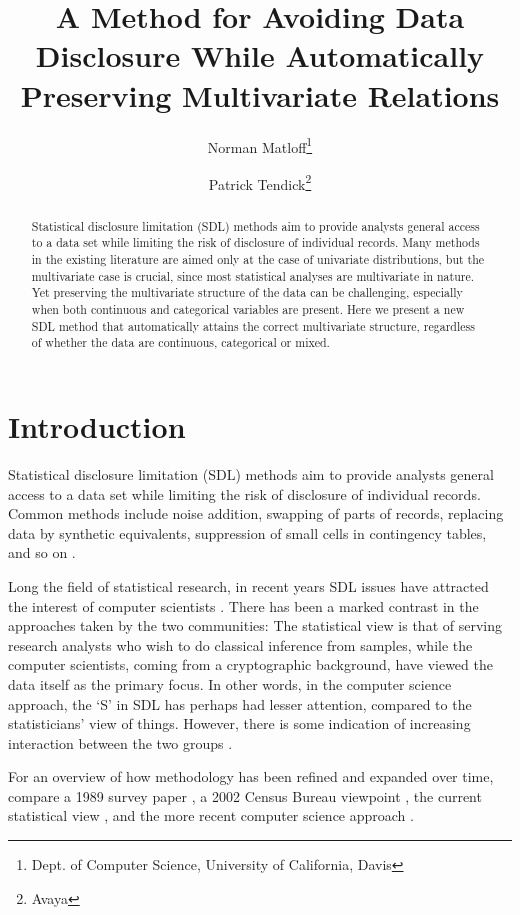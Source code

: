 \documentclass[11pt]{article}
\title{A Method for Avoiding Data Disclosure While
Automatically Preserving Multivariate Relations}
\author{
Norman Matloff\thanks{Dept. of Computer Science, University of
California, Davis}
\and
Patrick Tendick\thanks{Avaya}
}
\begin{document}
\maketitle

\begin{abstract}

\noindent 
Statistical disclosure limitation (SDL) methods aim to provide analysts
general access to a data set while limiting the risk of disclosure of
individual records.  Many methods in the existing literature are 
aimed only at the case of univariate distributions, but the 
multivariate case is crucial, since most statistical analyses are 
multivariate in nature.  Yet preserving the multivariate structure of 
the data can be challenging, especially when both continuous and
categorical variables are present.  Here we present a new SDL method 
that automatically attains the correct multivariate structure,
regardless of whether the data are continuous, categorical or mixed.

\end{abstract}

\section{Introduction}

Statistical disclosure limitation (SDL) methods aim to provide analysts
general access to a data set while limiting the risk of disclosure of
individual records.  Common methods include noise addition, swapping of
parts of records, replacing data by synthetic equivalents, suppression
of small cells in contingency tables, and so on \cite{duncan}. 


Long the field of statistical research, in recent years SDL issues have
attracted the interest of computer scientists \cite{dwork}.  There has
been a marked contrast in the approaches taken by the two communities:
The statistical view is that of serving research analysts who wish to do
classical inference from samples, while the computer scientists, coming
from a cryptographic background, have viewed the data itself as the
primary focus.  In other words, in the computer science approach, the
`S' in SDL has perhaps had lesser attention, compared to the
statisticians' view of things.  However, there is some indication of
increasing interaction between the two groups \cite{abowd}.

For an overview of how methodology has been refined and expanded over
time, compare a 1989 survey paper \cite{adam}, a 2002 Census Bureau
viewpoint \cite{census2002}, the current statistical view \cite{duncan},
and the more recent computer science approach \cite{dwork}.
\end{document}
